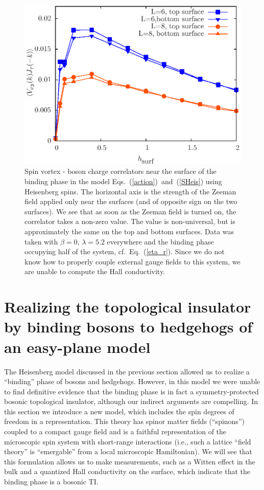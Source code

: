 \begin{figure}
\includegraphics[width=0.6\linewidth]{figures/vortexcor.eps}
\caption{Spin vortex - boson charge correlators near the surface of the binding phase in the model Eqs.~(\ref{action})~and~(\ref{SHeis}) using Heisenberg spins. The horizontal axis is the strength of the Zeeman field applied only near the surfaces (and of opposite sign on the two surfaces). We see that as soon as the Zeeman field is turned on, the correlator takes a non-zero value. The value is non-universal, but is approximately the same on the top and bottom surfaces. Data was taken with $\beta=0$, $\lambda=5.2$ everywhere and the binding phase occupying half of the system, cf.\ Eq.~(\ref{eta_r}).  Since we do not know how to properly couple external gauge fields to this system, we are unable to compute the Hall conductivity.
}
\label{heishall}
\end{figure}




\section{Realizing the topological insulator by binding bosons to hedgehogs of an easy-plane \cp model}
\label{section::CP1}

The Heisenberg model discussed in the previous section allowed us to realize a ``binding'' phase of bosons and hedgehogs. However, in this model we were unable to find definitive evidence that the binding phase is in fact a symmetry-protected bosonic topological insulator, although our indirect arguments are compelling. In this section we introduce a new model, which includes the spin degrees of freedom in a \cp representation. 
This theory has spinor matter fields (``spinons'') coupled to a compact gauge field and is a faithful representation of the microscopic spin system with short-range interactions (i.e., such a lattice ``field theory'' is ``emergable'' from a local microscopic Hamiltonian). We will see that this formulation allows us to make measurements, such as a Witten effect in the bulk and a quantized Hall conductivity on the surface, which indicate that the binding phase is a bosonic TI.

